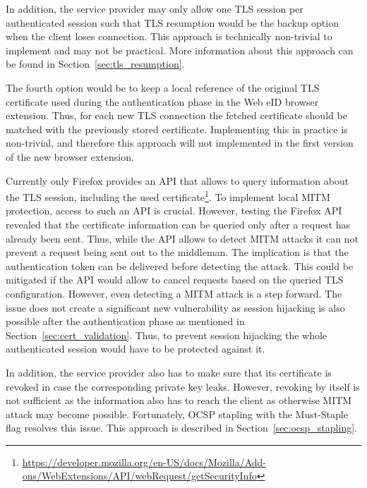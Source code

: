 In addition, the service provider may only allow one TLS session per authenticated session such that TLS resumption would be the backup option when the client loses connection. This approach is technically non-trivial to implement and may not be practical. More information about this approach can be found in Section~\ref{sec:tls_resumption}.

The fourth option would be to keep a local reference of the original TLS certificate used during the authentication phase in the Web eID browser extension. Thus, for each new TLS connection the fetched certificate should be matched with the previously stored certificate. Implementing this in practice is non-trivial, and therefore this approach will not implemented in the first version of the new browser extension. 

Currently only Firefox provides an API that allows to query information about the TLS session, including the used certificate\footnote{\url{https://developer.mozilla.org/en-US/docs/Mozilla/Add-ons/WebExtensions/API/webRequest/getSecurityInfo}}. To implement local MITM protection, access to such an API is crucial. However, testing the Firefox API revealed that the certificate information can be queried only after a request has already been sent. Thus, while the API allows to detect MITM attacks it can not prevent a request being sent out to the middleman. The implication is that the authentication token can be delivered before detecting the attack. This could be mitigated if the API would allow to cancel requests based on the queried TLS configuration. However, even detecting a MITM attack is a step forward. The issue does not create a significant new vulnerability as session hijacking is also possible after the authentication phase as mentioned in Section~\ref{sec:cert_validation}. Thus, to prevent session hijacking the whole authenticated session would have to be protected against it.

In addition, the service provider also has to make sure that its certificate is revoked in case the corresponding private key leaks. However, revoking by itself is not sufficient as the information also has to reach the client as otherwise MITM attack may become possible. Fortunately, OCSP stapling with the Must-Staple flag resolves this issue. This approach is described in Section~\ref{sec:ocsp_stapling}.
